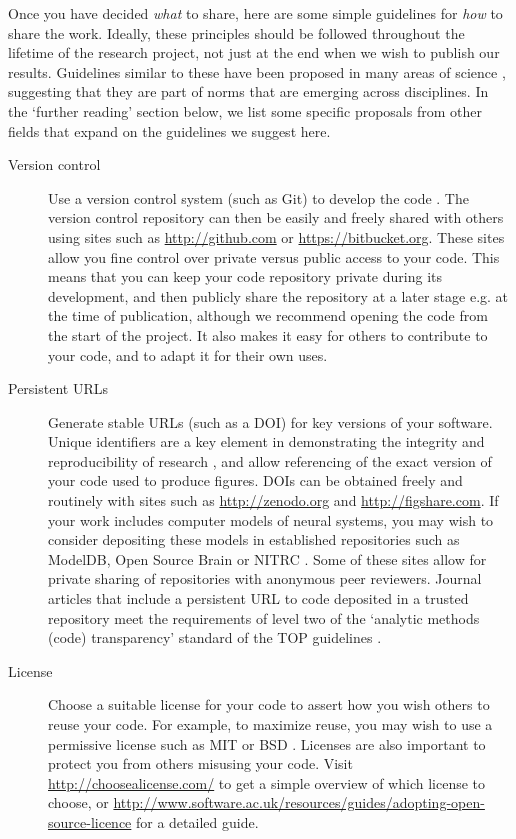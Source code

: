 \documentclass[11pt]{article}
\begin{document}
Once you have decided \textit{what} to share, here are some simple
guidelines for \textit{how} to share the work.  Ideally, these
principles should be followed throughout the lifetime of the research
project, not just at the end when we wish to publish our
results. Guidelines similar to these have been proposed in many areas
of science \cite{Nosek2015, miguel2014, stodden2012journals},
suggesting that they are part of norms that are emerging across
disciplines. In the `further reading' section below, we list some
specific proposals from other fields that expand on the guidelines we
suggest here.

\begin{description}
\item [Version control] Use a version control system (such as Git) to
  develop the code \cite{Blischak2016}.  The version control repository
  can then be easily and freely shared with others using sites such as
  \url{http://github.com} \cite{Ram2013} or
  \url{https://bitbucket.org}.  These sites allow you fine control
  over private versus public access to your code.  This means that you
  can keep your code repository private during its development, and
  then publicly share the repository at a later stage e.g. at the time
  of publication, although we recommend opening the code from the
  start of the project.  It also makes it easy for others to
  contribute to your code, and to adapt it for their own uses.

\item [Persistent URLs] Generate stable URLs (such as a DOI) for key
  versions of your software.  Unique identifiers are a key element in
  demonstrating the integrity and reproducibility of research
  \cite{vasilevsky2013reproducibility}, and allow referencing of the
  exact version of your code used to produce figures. DOIs can be
  obtained freely and routinely with sites such as
  \url{http://zenodo.org} and \url{http://figshare.com}.  If your work
  includes computer models of neural systems, you may wish to consider
  depositing these models in established repositories such as
  ModelDB\cite{modeldb}, Open Source Brain\cite{osb} or NITRC
  \cite{poline_software_2014}. Some of these sites allow for private
  sharing of repositories with anonymous peer reviewers. Journal
  articles that include a persistent URL to code deposited in a
  trusted repository meet the requirements of level two of the
  `analytic methods (code) transparency' standard of the TOP
  guidelines \cite{Nosek2015}.


\item [License] Choose a suitable license for your code to assert how
  you wish others to reuse your code.  For example, to maximize reuse,
  you may wish to use a permissive license such as MIT or BSD
  \cite{stodden2009enabling}.  Licenses are also important to protect you from
  others misusing your code.  Visit \url{http://choosealicense.com/}
  to get a simple overview of which license to choose, or 
  \url{http://www.software.ac.uk/resources/guides/adopting-open-source-licence}
  for a detailed guide.


\end{description}
\end{document}
